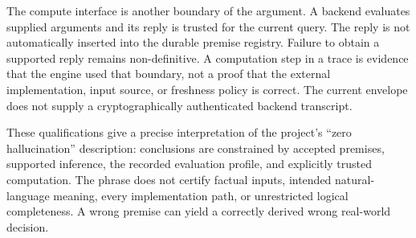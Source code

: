 The compute interface is another boundary of the argument. A backend evaluates
supplied arguments and its reply is trusted for the current query. The reply is
not automatically inserted into the durable premise registry. Failure to obtain
a supported reply remains non-definitive. A computation step in a trace is
evidence that the engine used that boundary, not a proof that the external
implementation, input source, or freshness policy is correct. The current
envelope does not supply a cryptographically authenticated backend transcript.

These qualifications give a precise interpretation of the project's
\enquote{zero hallucination} description: conclusions are constrained by accepted
premises, supported inference, the recorded evaluation profile, and explicitly
trusted computation. The phrase does not certify factual inputs, intended
natural-language meaning, every implementation path, or unrestricted logical
completeness. A wrong premise can yield a correctly derived wrong real-world
decision.
